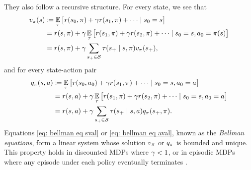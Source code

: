 They also follow a recursive structure. For every state, we see that 
\begin{align}
    \nonumber
    v_\pi(s)
    &\coloneqq \operatorname*{\mathbb{E}}_{\tau} \big[ r(s_0, \pi) + \gamma r(s_1, \pi) + 
    \dots \mid s_0 = s \big]
    \\
    \nonumber
    &= r(s, \pi) + \gamma \operatorname*{\mathbb{E}}_{\tau} \big[ r(s_1, \pi) + 
    \gamma r(s_2, \pi) + 
    \dots \mid s_0 = s, a_0 = \pi(s) \big]
    \\
    \label{eq: bellman eq sval}
    &= r(s, \pi) + \gamma \sum_{s_+ \in \mathcal{S}} \tau(s_+ \mid s, \pi) v_\pi(s_+) ,
\end{align}
and for every state-action pair
\begin{align}
    \nonumber
    q_\pi(s,a)
    &\coloneqq \operatorname*{\mathbb{E}}_{\tau} \big[ r(s_0, a_0) + \gamma r(s_1, \pi) + 
    \dots \mid s_0 = s, a_0 = a \big]
    \\
    \nonumber
    &= r(s, a) + \gamma \operatorname*{\mathbb{E}}_{\tau} \big[ r(s_1, \pi) + 
    \gamma r(s_2, \pi) + 
    \dots \mid s_0 = s, a_0 = a \big]
    \\
    \label{eq: bellman eq aval}
    &= r(s, a) + \gamma \sum_{s_+ \in \mathcal{S}} \tau(s_+ \mid s, a) q_\pi(s_+, \pi) .
\end{align}
Equations \eqref{eq: bellman eq sval} or \eqref{eq: bellman eq aval}, known as the \textit{Bellman equations}, form a linear system whose solution $v_\pi$ or $q_\pi$ is bounded and unique. This property holds in discounted MDPs where $\gamma < 1$,
or in episodic MDPs where any episode under each policy eventually terminates \citep{Bellman2010DynamicProgramming}.

